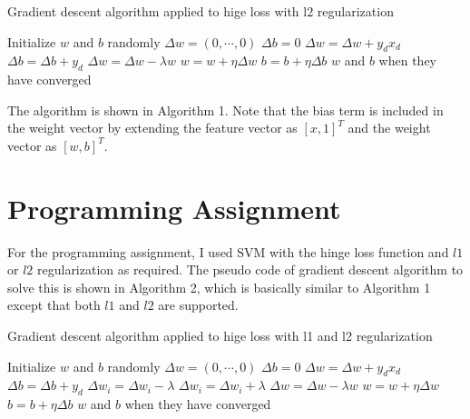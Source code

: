 \begin{enumerate}
\begin{enumerate}
\begin{algorithm}
\caption{Gradient descent algorithm applied to hige loss with l2 regularization}\label{euclid}
\begin{algorithmic}[1]
\State Initialize $w$ and $b$ randomly
\State $\Delta w=(0, \cdots, 0)$
\State $\Delta b=0$
\State $\Delta w= \Delta w+y_d x_d$
\State $\Delta b=\Delta b+y_d$
\EndIf
\EndFor
\State $\Delta w=\Delta w - \lambda w$
\State $w=w+\eta \Delta w$
\State $b=b+\eta \Delta b$
\State \Return $w$ and $b$ when they have converged
\EndFor
\EndProcedure
\end{algorithmic}
\end{algorithm}

The algorithm is shown in Algorithm 1. Note that the bias term is included in the weight vector by extending the feature vector as $[x, 1]^T$ and the weight vector as $[w, b]^T$.



\end{enumerate}

\end{enumerate}

\section{Programming Assignment}

For the programming assignment, I used SVM with the hinge loss function and $l1$ or $l2$ regularization as required. The pseudo code of gradient descent algorithm to solve this is shown in Algorithm 2, which is basically similar to Algorithm 1 except that both $l1$ and $l2$ are supported.

\begin{algorithm}
\caption{Gradient descent algorithm applied to hige loss with l1 and l2 regularization}\label{euclid}
\begin{algorithmic}[1]
\State Initialize $w$ and $b$ randomly
\State $\Delta w=(0, \cdots, 0)$
\State $\Delta b=0$
\State $\Delta w= \Delta w+y_d x_d$
\State $\Delta b=\Delta b+y_d$
\EndIf
\EndFor
{}
\State $\Delta w_i=\Delta w_i-\lambda$
\Else
\State $\Delta w_i=\Delta w_i+\lambda$
\EndIf
\EndFor
{}
\State $\Delta w=\Delta w - \lambda w$
\EndIf
\State $w=w+\eta \Delta w$
\State $b=b+\eta \Delta b$
\State \Return $w$ and $b$ when they have converged
\EndFor
\EndProcedure
\end{algorithmic}
\end{algorithm}

